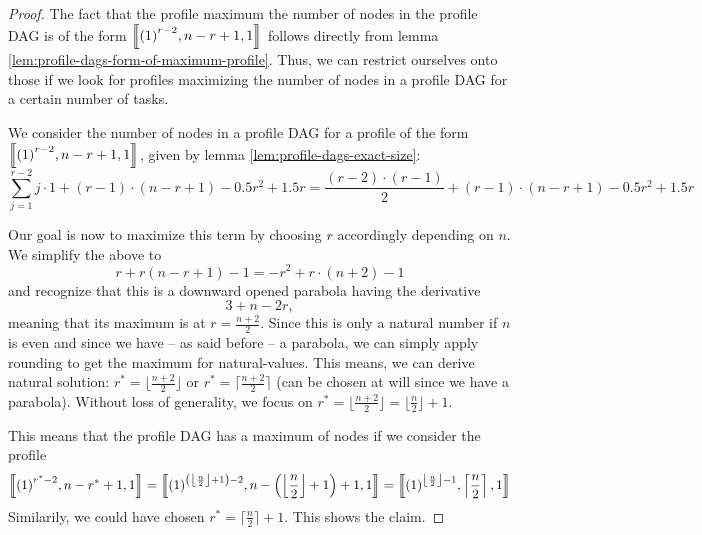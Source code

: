 \begin{proof}
  The fact that the profile maximum the number of nodes in the profile DAG is of the form $\left\llbracket {(1)}^{r-2},n-r+1,1 \right\rrbracket$ follows directly from lemma \ref{lem:profile-dags-form-of-maximum-profile}. Thus, we can restrict ourselves onto those if we look for profiles maximizing the number of nodes in a profile DAG for a certain number of tasks.
  
  We consider the number of nodes in a profile DAG for a profile of the form $\left\llbracket {(1)}^{r-2},n-r+1,1 \right\rrbracket$, given by lemma \ref{lem:profile-dags-exact-size}:
  \begin{equation*}
    \sum_{j=1}^{r-2} j \cdot 1 + (r-1)\cdot(n-r+1) -0.5r^2 +1.5r = \frac{(r-2)\cdot(r-1)}{2} + (r-1)\cdot(n-r+1) -0.5r^2 +1.5r
  \end{equation*}

  Our goal is now to maximize this term by choosing $r$ accordingly depending on $n$. We simplify the above to
  \begin{equation*}
    r+r \left( n-r+1 \right) -1 = -r^2+r\cdot(n+2)-1
  \end{equation*}
  and recognize that this is a downward opened parabola having the derivative
  \begin{equation*}
    3+n-2r,
  \end{equation*}
  meaning that its maximum is at $r=\frac{n+2}{2}$. Since this is only a natural number if $n$ is even and since we have -- as said before -- a parabola, we can simply apply rounding to get the maximum for natural-values. This means, we can derive natural solution: $r^*=\lfloor \frac{n+2}{2} \rfloor$ or $r^*=\lceil \frac{n+2}{2} \rceil$ (can be chosen at will since we have a parabola). Without loss of generality, we focus on $r^*=\lfloor \frac{n+2}{2} \rfloor = \lfloor\frac{n}{2} \rfloor + 1$.

  This means that the profile DAG has a maximum of nodes if we consider the profile
  \begin{equation*}
    \left\llbracket {(1)}^{r^*-2},n-r^*+1,1 \right\rrbracket = 
    \left\llbracket 
      {(1)}^{\left( \left\lfloor\frac{n}{2} \right\rfloor + 1 \right)-2},
      n-\left( \left\lfloor\frac{n}{2} \right\rfloor + 1 \right)+1,
      1
     \right\rrbracket = 
    \left\llbracket 
      {(1)}^{ \left\lfloor\frac{n}{2} \right\rfloor - 1},
      \left\lceil \frac{n}{2} \right\rceil,
      1
     \right\rrbracket 
  \end{equation*}
  Similarily, we could have chosen $r^*=\lceil\frac{n}{2}\rceil+1$. This shows the claim.
\end{proof}

